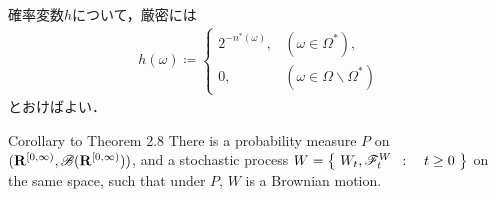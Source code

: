 	確率変数$h$について，厳密には
	\begin{align}
		h(\omega) \coloneqq 
		\begin{cases}
			2^{-n^*(\omega)}, & (\omega \in \Omega^*), \\
			0, & (\omega \in \Omega \backslash \Omega^*)
		\end{cases}
	\end{align}
	とおけばよい．
	
	\begin{itembox}[l]{Corollary to Theorem 2.8}
		There is a probability measure $P$ on $(\mathbf{R}^{[0,\infty)},\mathscr{B}(\mathbf{R}^{[0,\infty)}))$,
		and a stochastic process $W = \left\{\ W_t,\mathscr{F}_t^W\ \, : \quad t \geq 0\ \right\}$ on the same space,
		such that under $P$, $W$ is a Brownian motion.
	\end{itembox}
	
